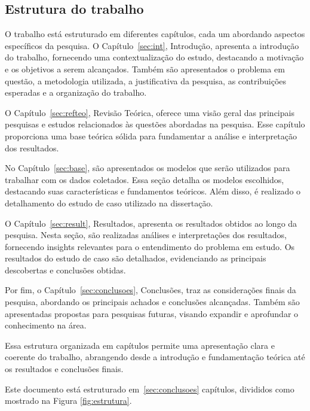 \subsection{Estrutura do trabalho} \label{subsec:estrutura}


O trabalho está estruturado em diferentes capítulos, cada um abordando aspectos específicos da pesquisa. 
O Capítulo~\ref{sec:int}, Introdução, apresenta a introdução do trabalho, fornecendo uma contextualização do estudo, destacando a motivação e os objetivos a serem alcançados. Também são apresentados o problema em questão, a metodologia utilizada, a justificativa da pesquisa, as contribuições esperadas e a organização do trabalho.

O Capítulo~\ref{sec:refteo}, Revisão Teórica, oferece uma visão geral das principais pesquisas e estudos relacionados às questões abordadas na pesquisa. Esse capítulo proporciona uma base teórica sólida para fundamentar a análise e interpretação dos resultados.

No Capítulo~\ref{sec:base}, são apresentados os modelos que serão utilizados para trabalhar com os dados coletados. Essa seção detalha os modelos escolhidos, destacando suas características e fundamentos teóricos. Além disso, é realizado o detalhamento do estudo de caso utilizado na dissertação.


O Capítulo~\ref{sec:result}, Resultados, apresenta os resultados obtidos ao longo da pesquisa. Nesta seção, são realizadas análises e interpretações dos resultados, fornecendo insights relevantes para o entendimento do problema em estudo. Os resultados do estudo de caso são detalhados, evidenciando as principais descobertas e conclusões obtidas.

Por fim, o Capítulo~\ref{sec:conclusoes}, Conclusões, traz as considerações finais da pesquisa, abordando os principais achados e conclusões alcançadas. Também são apresentadas propostas para pesquisas futuras, visando expandir e aprofundar o conhecimento na área.

Essa estrutura organizada em capítulos permite uma apresentação clara e coerente do trabalho, abrangendo desde a introdução e fundamentação teórica até os resultados e conclusões finais.

Este documento está estruturado em~\ref{sec:conclusoes} capítulos, divididos como mostrado na Figura \ref{fig:estrutura}.
 
